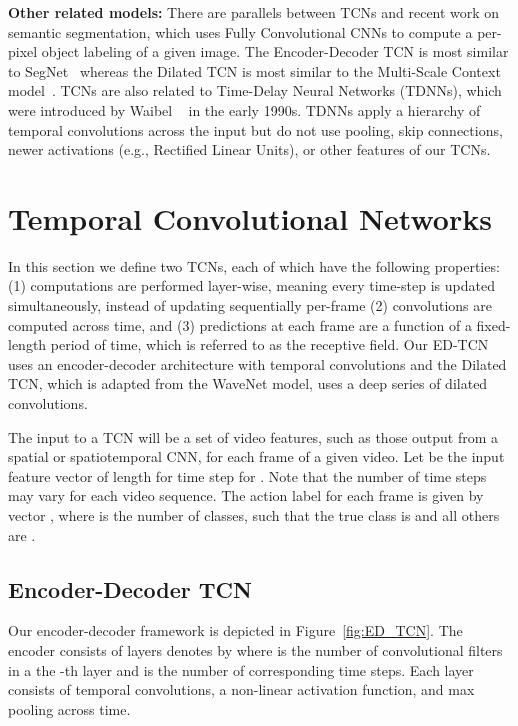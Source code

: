 \documentclass[10pt,twocolumn,letterpaper]{article}
\newcommand{\fakesubsection}[1]{\smallskip\noindent\textbf{#1:}}
\begin{document}
\fakesubsection{Other related models}
There are parallels between TCNs and recent work on semantic segmentation, which uses Fully Convolutional CNNs to compute a per-pixel object labeling of a given image. The Encoder-Decoder TCN is most similar to SegNet~\cite{badrinarayanan_arxiv_2015} whereas the Dilated TCN is most similar to the Multi-Scale Context model~\cite{yu_iclr_2016}. TCNs are also related to Time-Delay Neural Networks (TDNNs), which were introduced by Waibel \etal~\cite{Waibel_1990} in the early 1990s. TDNNs apply a hierarchy of temporal convolutions across the input but do not use pooling, skip connections, newer activations (e.g., Rectified Linear Units), or other features of our TCNs.




%
 \section{Temporal Convolutional Networks}
\label{sec:TCN}

In this section we define two TCNs, each of which have the following properties: (1) computations are performed layer-wise, meaning every time-step is updated simultaneously, instead of updating sequentially per-frame (2) convolutions are computed across time, and (3) predictions at each frame are a function of a fixed-length period of time, which is referred to as the receptive field. 
Our ED-TCN uses an encoder-decoder architecture with temporal convolutions and the Dilated TCN, which is adapted from the WaveNet model, uses a deep series of dilated convolutions.



The input to a TCN will be a set of video features, such as those output from a spatial or spatiotemporal CNN, for each frame of a given video.
Let  be the input feature vector of length  for time step  for . Note that the number of time steps  may vary for each video sequence.
The action label for each frame is given by vector
, where  is the number of classes, such that the true class is  and all others are .

\subsection{Encoder-Decoder TCN}
\label{sec:EDTCN}

Our encoder-decoder framework is depicted in Figure~\ref{fig:ED_TCN}.
The encoder consists of  layers 
denotes by 
where  is the number of convolutional filters in a the -th layer and  is the number of corresponding time steps. 
Each layer consists of temporal convolutions, a non-linear activation function, and max pooling across time. 
\end{document}
